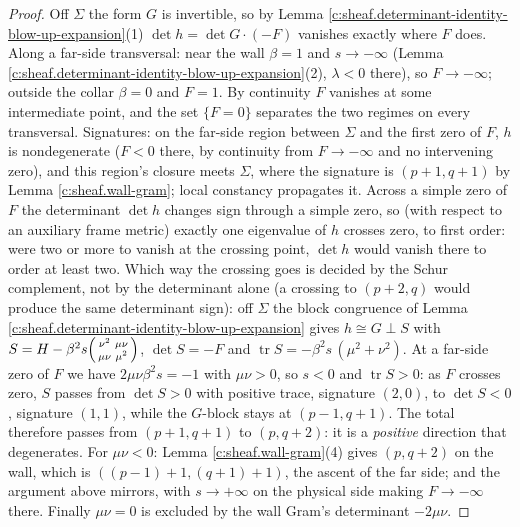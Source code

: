 \documentclass[11pt]{article}
\theoremstyle{definition}
\theoremstyle{plain}
\providecommand{\Sig}{}\renewcommand{\Sig}{\Sigma}
\begin{document}
\begin{proof}
Off $\Sig$ the form $G$ is invertible, so by Lemma \ref{c:sheaf.determinant-identity-blow-up-expansion}(1) $\det h = \det G \cdot (-F)$ vanishes exactly where $F$ does. Along a far-side transversal: near the wall $\beta = 1$ and $s \to -\infty$ (Lemma \ref{c:sheaf.determinant-identity-blow-up-expansion}(2), $\lambda < 0$ there), so $F \to -\infty$; outside the collar $\beta = 0$ and $F = 1$. By continuity $F$ vanishes at some intermediate point, and the set $\{F = 0\}$ separates the two regimes on every transversal. Signatures: on the far-side region between $\Sig$ and the first zero of $F$, $h$ is nondegenerate ($F < 0$ there, by continuity from $F \to -\infty$ and no intervening zero), and this region's closure meets $\Sig$, where the signature is $(p{+}1,q{+}1)$ by Lemma \ref{c:sheaf.wall-gram}; local constancy propagates it. Across a simple zero of $F$ the determinant $\det h$ changes sign through a simple zero, so (with respect to an auxiliary frame metric) exactly one eigenvalue of $h$ crosses zero, to first order: were two or more to vanish at the crossing point, $\det h$ would vanish there to order at least two. Which way the crossing goes is decided by the Schur complement, not by the determinant alone (a crossing to $(p{+}2, q)$ would produce the same determinant sign): off $\Sig$ the block congruence of Lemma \ref{c:sheaf.determinant-identity-blow-up-expansion} gives $h \cong G \perp S$ with $S = H - \beta^2 s \begin{psmallmatrix} \nu^2 & \mu\nu \\ \mu\nu & \mu^2 \end{psmallmatrix}$, $\det S = -F$ and $\operatorname{tr} S = -\beta^2 s\,(\mu^2 + \nu^2)$. At a far-side zero of $F$ we have $2\mu\nu\beta^2 s = -1$ with $\mu\nu > 0$, so $s < 0$ and $\operatorname{tr} S > 0$: as $F$ crosses zero, $S$ passes from $\det S > 0$ with positive trace, signature $(2,0)$, to $\det S < 0$, signature $(1,1)$, while the $G$-block stays at $(p{-}1, q{+}1)$. The total therefore passes from $(p{+}1, q{+}1)$ to $(p, q{+}2)$: it is a \emph{positive} direction that degenerates. For $\mu\nu < 0$: Lemma \ref{c:sheaf.wall-gram}(4) gives $(p, q{+}2)$ on the wall, which is $((p{-}1){+}1, (q{+}1){+}1)$, the ascent of the far side; and the argument above mirrors, with $s \to +\infty$ on the physical side making $F \to -\infty$ there. Finally $\mu\nu = 0$ is excluded by the wall Gram's determinant $-2\mu\nu$.

\end{proof}
\end{document}
